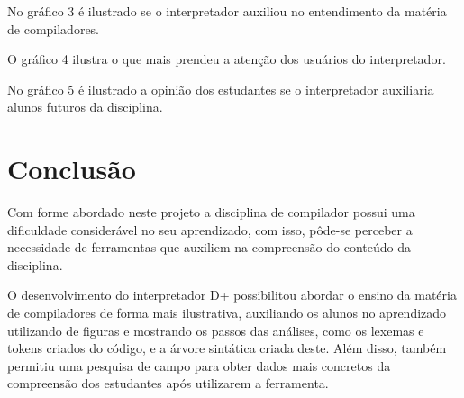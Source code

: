 \documentclass[12pt,oneside,a4paper,chapter=TITLE,section=TITLE,sumario=tradicional]{abntex2}
\begin{document}
\begin{grafico}[H]
\end{grafico}

No gráfico 3 é ilustrado se o interpretador auxiliou no entendimento da matéria de compiladores.

\begin{grafico}[H]
\end{grafico}

O gráfico 4 ilustra o que mais prendeu a atenção dos usuários do interpretador.

\begin{grafico}[H]
\end{grafico}

No gráfico 5 é ilustrado a opinião dos estudantes se o interpretador auxiliaria alunos futuros da disciplina.

\begin{grafico}[H]
\end{grafico}

\chapter{Conclusão}
\label{cap:conclusao}

Com forme abordado neste projeto a disciplina de compilador possui uma dificuldade considerável no seu aprendizado, com isso, pôde-se perceber a necessidade de ferramentas que auxiliem na compreensão do conteúdo da disciplina.

O desenvolvimento do interpretador D+ possibilitou abordar o ensino da matéria de compiladores de forma mais ilustrativa, auxiliando os alunos no aprendizado utilizando de figuras e mostrando os passos das análises, como os lexemas e tokens criados do código, e a árvore sintática criada deste. Além disso, também permitiu uma pesquisa de campo para obter dados mais concretos da compreensão dos estudantes após utilizarem a ferramenta.
\end{document}
